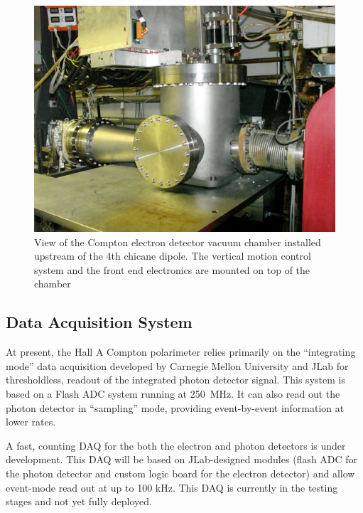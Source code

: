  \begin{figure}[htp]
    \begin{center}
        \includegraphics*[angle=0,scale=0.7]{compton_edet}
    \end{center}
    \caption[compton:electron detector]{
            View of the Compton electron detector vacuum chamber installed upstream of the 4th chicane dipole. 
            The vertical motion control system and the front end electronics are mounted on top of the chamber 
            }
    \label{fig:compton_edet}
 \end{figure}


\subsection{Data Acquisition System}
\label{sec:compton_daq}

At present, the Hall A Compton polarimeter relies primarily on the ``integrating mode'' data acquisition developed by
Carnegie Mellon University and JLab for thresholdless, readout of the integrated photon detector signal. This system
is based on a Flash ADC system running at 250~MHz. It can also read out the photon detector in ``sampling'' mode, providing
event-by-event information at lower rates.

A fast, counting DAQ for the both the electron and photon detectors is under development. This DAQ will be based on
JLab-designed modules (flash ADC for the photon detector and custom logic board for the electron detector) and allow
event-mode read out at up to 100 kHz. This DAQ is currently in the testing stages and not yet fully deployed.

